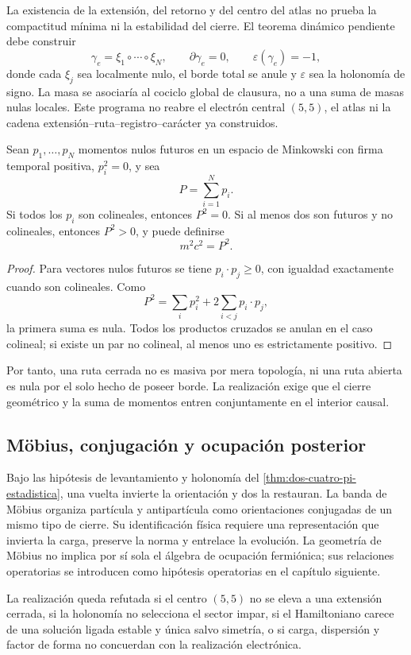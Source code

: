 La existencia de la extensión, del retorno y del centro del atlas no prueba
la compactitud mínima ni la estabilidad del cierre. El teorema dinámico
pendiente debe construir
\[
 \gamma_e=\xi_1\circ\cdots\circ\xi_N,
 \qquad
 \partial\gamma_e=0,
 \qquad
 \varepsilon(\gamma_e)=-1,
\]
donde cada \(\xi_j\) sea localmente nulo, el borde total se anule y
\(\varepsilon\) sea la holonomía de signo. La masa se asociaría al cociclo
global de clausura, no a una suma de masas nulas locales. Este programa no
reabre el electrón central \((5,5)\), el atlas ni la cadena
extensión--ruta--registro--carácter ya construidos.

\begin{proposition}
\label{prop:cierre-nulos-interior-causal}
Sean \(p_1,\ldots,p_N\) momentos nulos futuros en un espacio de Minkowski con
firma temporal positiva, \(p_i^2=0\), y sea
\[
 P=\sum_{i=1}^{N}p_i.
\]
Si todos los \(p_i\) son colineales, entonces \(P^2=0\). Si al menos dos son
futuros y no colineales, entonces \(P^2>0\), y puede definirse
\[
 m^2c^2=P^2.
\]
\end{proposition}

\begin{proof}
Para vectores nulos futuros se tiene
\(p_i\cdot p_j\geq0\), con igualdad exactamente cuando son colineales.
Como
\[
 P^2=\sum_i p_i^2+2\sum_{i<j}p_i\cdot p_j,
\]
la primera suma es nula. Todos los productos cruzados se anulan en el caso
colineal; si existe un par no colineal, al menos uno es estrictamente
positivo.
\end{proof}

Por tanto, una ruta cerrada no es masiva por mera topología, ni una ruta
abierta es nula por el solo hecho de poseer borde. La realización exige que
el cierre geométrico y la suma de momentos entren conjuntamente en el
interior causal.

\subsection{Möbius, conjugación y ocupación posterior}

Bajo las hipótesis de levantamiento y holonomía del
\cref{thm:dos-cuatro-pi-estadistica}, una vuelta invierte la orientación y
dos la restauran. La banda de Möbius organiza partícula y antipartícula como
orientaciones conjugadas de un mismo tipo de cierre. Su identificación física
requiere una representación que invierta la carga, preserve la norma y
entrelace la evolución. La geometría de Möbius no implica por sí sola el
álgebra de ocupación fermiónica; sus relaciones operatorias se
introducen como hipótesis operatorias en el capítulo siguiente.

\begin{criterion}
\label{crit:cierre-electronico}
La realización queda refutada si el centro \((5,5)\) no se eleva a una
extensión cerrada, si la holonomía no selecciona el sector impar, si el
Hamiltoniano carece de una solución ligada estable y única salvo simetría, o
si carga, dispersión y factor de forma no concuerdan con la realización
electrónica.
\end{criterion}
